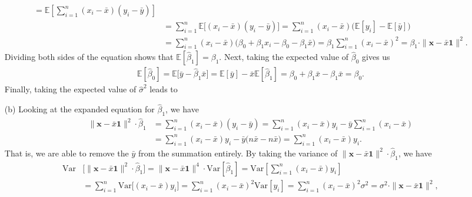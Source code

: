 \documentclass[10pt]{article}
\begin{document}
\begin{itemize}
\begin{align*}
        = \mathbb{E} \left[ \sum_{i=1}^n (x_i - \bar{x})(y_i - \bar{y}) \right] \\ 
        &= \sum_{i=1}^n \mathbb{E} \big[ (x_i - \bar{x})(y_i - \bar{y}) \big] 
        = \sum_{i=1}^n (x_i - \bar{x}) \big( \mathbb{E}[y_i] - \mathbb{E}[\bar{y}] \big) \\
        &= \sum_{i=1}^n (x_i - \bar{x}) \big( \beta_0 + \beta_1 x_i - \beta_0 - \beta_1 \bar{x} \big)
        = \beta_1 \sum_{i=1}^n (x_i - \bar{x})^2 
        = \beta_1 \cdot \|\mathbf{x} - \bar{x}\mathbf{1}\|^2.
    \end{align*}
    Dividing both sides of the equation shows that \(\mathbb{E}[\hat{\beta}_1] = \beta_1\).
    Next, taking the expected value of \(\hat{\beta}_0\) gives us 
    \begin{align*}
        \mathbb{E}[\hat{\beta}_0] = \mathbb{E} \big[ \bar{y} - \hat{\beta}_1 \bar{x} \big] 
        = \mathbb{E}[\bar{y}] - \bar{x}\mathbb{E}[\hat{\beta}_1] 
        = \beta_0 + \beta_1 \bar{x} - \beta_1 \bar{x}
        = \beta_0.
    \end{align*}
    Finally, taking the expected value of \(\hat{\sigma}^2\) leads to 
    \item[(b)] Looking at the expanded equation for \(\hat{\beta}_1\), we have 
    \begin{align*}
        \|\mathbf{x} - \bar{x}\mathbf{1}\|^2 \cdot \hat{\beta}_1 &= \sum_{i=1}^n (x_i - \bar{x})(y_i - \bar{y})
        = \sum_{i=1}^n (x_i - \bar{x}) y_i - \bar{y} \sum_{i=1}^n (x_i - \bar{x}) \\
        &= \sum_{i=1}^n (x_i - \bar{x}) y_i - \bar{y} \big( n \bar{x} - n \bar x \big)
        = \sum_{i=1}^n (x_i - \bar{x}) y_i.
    \end{align*}
    That is, we are able to remove the \(\bar{y}\) from the summation entirely. By taking the variance of 
    \(\|\mathbf{x} - \bar{x}\mathbf{1}\|^2 \cdot \hat{\beta}_1\), we have 
    \begin{align*}
        \mathrm{Var} &\Big[ \|\mathbf{x} - \bar{x}\mathbf{1}\|^2 \cdot \hat{\beta}_1 \Big]
        = \|\mathbf{x} - \bar{x}\mathbf{1}\|^4 \cdot \mathrm{Var}[\hat{\beta}_1]
        = \mathrm{Var} \left[ \sum_{i=1}^n (x_i - \bar{x}) y_i \right] \\
        &= \sum_{i=1}^n \mathrm{Var}\big[(x_i - \bar{x}) y_i\big]
        = \sum_{i=1}^n (x_i - \bar{x})^2 \mathrm{Var}[y_i]
        = \sum_{i=1}^n (x_i - \bar{x})^2 \sigma^2
        = \sigma^2 \cdot \|\mathbf{x} - \bar{x}\mathbf{1}\|^2,
    \end{align*}

\end{itemize}
\end{document}
